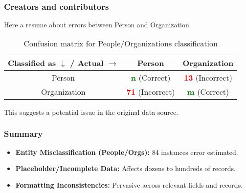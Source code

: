 \subsubsection{Creators and contributors}
Here a resume about errors between Person and Organization
\begin{table}[h]
    \centering
    \begin{tabular}{|c|c|c|}
        \hline
        Classified as $\downarrow$ / Actual $\rightarrow$ & Person & Organization \\
        \hline
        Person &  \textcolor{green}{\textbf{n}} (Correct) & \textcolor{red}{\textbf{13}} (Incorrect) \\
        \hline
        Organization & \textcolor{red}{\textbf{71}} (Incorrect) &  \textcolor{green}{\textbf{m}} (Correct) \\
        \hline
    \end{tabular}
    \caption{Confusion matrix for People/Organizations classification}
    \label{tab:people_org}
\end{table}
\newline
This suggests a potential issue in the original data source.





\subsubsection{Summary}
\begin{itemize}
    \item \textbf{Entity Misclassification (People/Orgs):} 84 instances error estimated.
    \item \textbf{Placeholder/Incomplete Data:} Affects dozens to hundreds of records.
    \item \textbf{Formatting Inconsistencies:} Pervasive across relevant fields and records.
\end{itemize}
